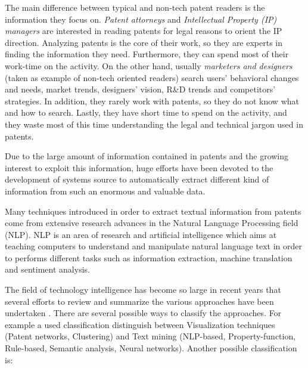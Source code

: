 \documentclass[]{book}
\begin{document}
The main difference between typical and non-tech patent readers is the
information they focus on. \emph{Patent attorneys} and
\emph{Intellectual Property (IP) managers} are interested in reading
patents for legal reasons to orient the IP direction. Analyzing patents
is the core of their work, so they are experts in finding the
information they need. Furthermore, they can spend most of their
work-time on the activity. On the other hand, usually \emph{marketers
and designers} (taken as example of non-tech oriented readers) search
users' behavioral changes and needs, market trends, designers' vision,
R\&D trends and competitors' strategies. In addition, they rarely work
with patents, so they do not know what and how to search. Lastly, they
have short time to spend on the activity, and they waste most of this
time understanding the legal and technical jargon used in patents.

Due to the large amount of information contained in patents and the
growing interest to exploit this information, huge efforts have been
devoted to the development of systems source to automatically extract
different kind of information from such an enormous and valuable data.

Many techniques introduced in order to extract textual information from
patents come from extensive research advances in the Natural Language
Processing field (NLP). NLP is an area of research and artificial
intelligence which aims at teaching computers to understand and
manipulate natural language text in order to performs different tasks
such as information extraction, machine translation and sentiment
analysis.

The field of technology intelligence has become so large in recent years
that several efforts to review and summarize the various approaches have
been undertaken \citep{abbas2014literature}. There are several possible
ways to classify the approaches. For example a used classification
distinguish between Visualization techniques (Patent networks,
Clustering) and Text mining (NLP-based, Property-function, Rule-based,
Semantic analysis, Neural networks). Another possible classification is:
\end{document}

